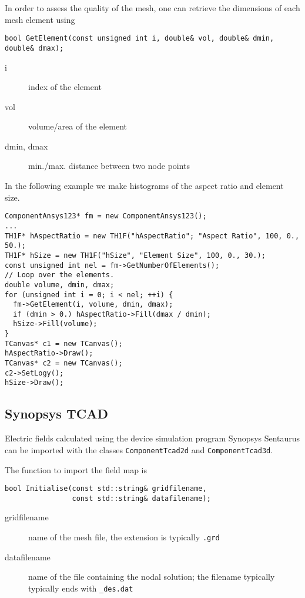 In order to assess the quality of the mesh, 
one can retrieve the dimensions of each mesh element using
\begin{lstlisting}
bool GetElement(const unsigned int i, double& vol, double& dmin, double& dmax);
\end{lstlisting}
\begin{description}
\item[i] index of the element
\item[vol] volume/area of the element
\item[dmin, dmax] min./max. distance between two node points
\end{description}

In the following example we make histograms of the aspect ratio and 
element size.
\begin{lstlisting}
ComponentAnsys123* fm = new ComponentAnsys123();
...
TH1F* hAspectRatio = new TH1F("hAspectRatio"; "Aspect Ratio", 100, 0., 50.);
TH1F* hSize = new TH1F("hSize", "Element Size", 100, 0., 30.);
const unsigned int nel = fm->GetNumberOfElements();
// Loop over the elements.
double volume, dmin, dmax;
for (unsigned int i = 0; i < nel; ++i) {
  fm->GetElement(i, volume, dmin, dmax);
  if (dmin > 0.) hAspectRatio->Fill(dmax / dmin);
  hSize->Fill(volume);
}
TCanvas* c1 = new TCanvas();
hAspectRatio->Draw();
TCanvas* c2 = new TCanvas();
c2->SetLogy();
hSize->Draw();
\end{lstlisting}

\subsection{Synopsys TCAD}

Electric fields calculated using the device simulation program 
Synopsys Sentaurus \cite{Synopsys} can be imported with the classes 
\texttt{ComponentTcad2d} and \texttt{ComponentTcad3d}.

The function to import the field map is 
\begin{lstlisting}
bool Initialise(const std::string& gridfilename,
                const std::string& datafilename);
\end{lstlisting}
\begin{description}
  \item[gridfilename]
  name of the mesh file, the extension is typically \texttt{.grd}
  \item[datafilename]
  name of the file containing the nodal solution;
  the filename typically typically ends with \texttt{\_des.dat}
\end{description}

